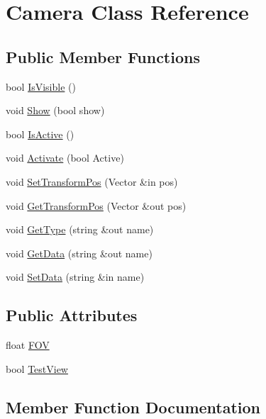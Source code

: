 \hypertarget{class_camera}{}\section{Camera Class Reference}
\label{class_camera}
\subsection*{Public Member Functions}
\begin{DoxyCompactItemize}
\item 
bool \hyperlink{class_camera_a31eb1e05ad8329e2a33291506ce2d0c8}{Is\+Visible} ()
\item 
void \hyperlink{class_camera_a30ac44be4d88db523fc32bf00c395212}{Show} (bool show)
\item 
bool \hyperlink{class_camera_a602657601be729845b111704b4c13193}{Is\+Active} ()
\item 
void \hyperlink{class_camera_a4805de0f08dbec631cf71593c6d39270}{Activate} (bool Active)
\item 
void \hyperlink{class_camera_aa3f6d3f73966736a4b7d9954b6965b34}{Set\+Transform\+Pos} (Vector \&in pos)
\item 
void \hyperlink{class_camera_a71a1dcac29eec2c4b4ca9aab05604b56}{Get\+Transform\+Pos} (Vector \&out pos)
\item 
void \hyperlink{class_camera_ae3cefb085319c07348cc2c5c39a675c1}{Get\+Type} (string \&out name)
\item 
void \hyperlink{class_camera_a864de2841f5ba7e6fb839617c488b3e8}{Get\+Data} (string \&out name)
\item 
void \hyperlink{class_camera_aa2f9cfe6cc8c8d268a8b0782114ba43d}{Set\+Data} (string \&in name)
\end{DoxyCompactItemize}
\subsection*{Public Attributes}
\begin{DoxyCompactItemize}
\item 
float \hyperlink{class_camera_a3da8abd27e67cf8ebca6a8fadc4bae43}{F\+OV}
\item 
bool \hyperlink{class_camera_a8be8f1ca0c8dbdf62b92cef368f67584}{Test\+View}
\end{DoxyCompactItemize}


\subsection{Member Function Documentation}
\hypertarget{class_camera_a4805de0f08dbec631cf71593c6d39270}{}\label{class_camera_a4805de0f08dbec631cf71593c6d39270} 
